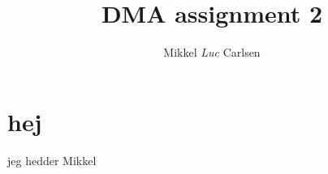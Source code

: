 \documentclass[a4paper]{article}
\title{DMA assignment 2}
\author{Mikkel \emph{Luc} Carlsen}
\begin{document}
\section{hej}

jeg hedder Mikkel
\end{document}
